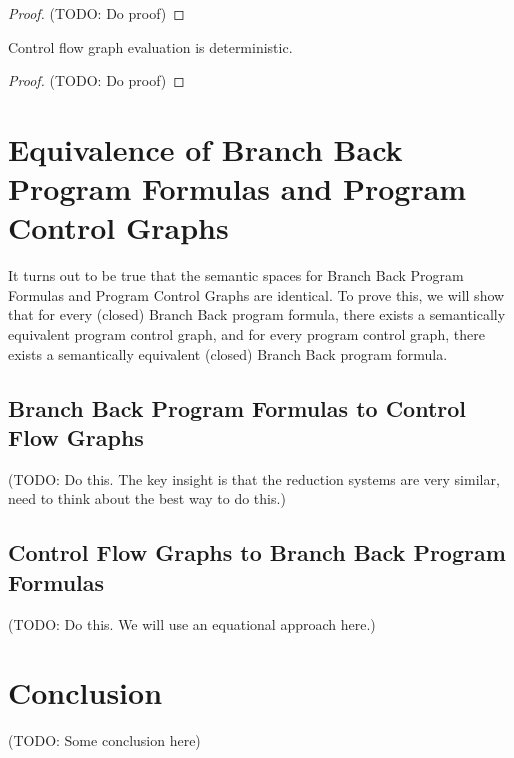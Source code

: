 \documentclass[11pt]{article}
\begin{document}
\begin{proof}
(TODO: Do proof)
\end{proof}

\newtheorem*{evalcfgdeterminism}{Theorem}
\begin{evaldeterminism}
Control flow graph evaluation is deterministic.
\end{evaldeterminism}

\begin{proof}
(TODO: Do proof)
\end{proof}

\begin{comment}
\newtheorem*{evalcfgnotnormalizing}{Theorem}
\begin{evalnotnormalizing}
Evaluation is not generally normalizing.
\end{evalnotnormalizing}

\begin{proof}
(TODO: Do proof)
\end{proof}
\end{comment}

\section{Equivalence of Branch Back Program Formulas and Program Control Graphs}

It turns out to be true that the semantic spaces for Branch Back Program Formulas and Program Control Graphs are identical.  To prove this, we will show that for every (closed) Branch Back program formula, there exists a semantically equivalent program control graph, and for every program control graph, there exists a semantically equivalent (closed) Branch Back program formula.

\subsection{Branch Back Program Formulas to Control Flow Graphs}

(TODO: Do this.  The key insight is that the reduction systems are very similar, need to think about the best way to do this.)

\subsection{Control Flow Graphs to Branch Back Program Formulas}

(TODO: Do this.  We will use an equational approach here.)

\section{Conclusion}

(TODO: Some conclusion here)
\end{document}
